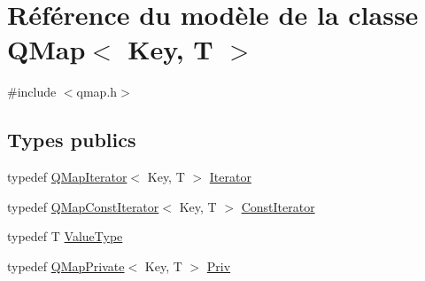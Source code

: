 \hypertarget{class_q_map}{}\section{Référence du modèle de la classe Q\+Map$<$ Key, T $>$}
\label{class_q_map}


{\ttfamily \#include $<$qmap.\+h$>$}

\subsection*{Types publics}
\begin{DoxyCompactItemize}
\item 
typedef \hyperlink{class_q_map_iterator}{Q\+Map\+Iterator}$<$ Key, T $>$ \hyperlink{class_q_map_aa920e1d34440b34269b350ab96bd73d0}{Iterator}
\item 
typedef \hyperlink{class_q_map_const_iterator}{Q\+Map\+Const\+Iterator}$<$ Key, T $>$ \hyperlink{class_q_map_afa9389e1d78c9571f1353fdbf0b267b4}{Const\+Iterator}
\item 
typedef T \hyperlink{class_q_map_a207394e4bdb1d29a8a456991953cc42b}{Value\+Type}
\item 
typedef \hyperlink{class_q_map_private}{Q\+Map\+Private}$<$ Key, T $>$ \hyperlink{class_q_map_af63078f1afbbec29ac319ddbd88aefdd}{Priv}
\end{DoxyCompactItemize}
